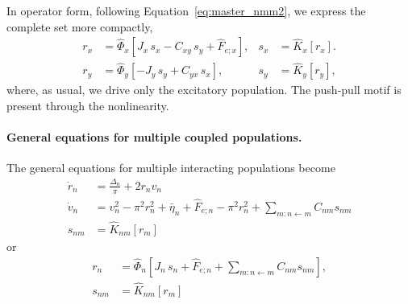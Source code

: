 \documentclass[12pt]{article}
\numberwithin{equation}{section}
\begin{document}
In operator form, following Equation~\ref{eq:master_nmm2}, we express the complete set more compactly,
\begin{equation}
\begin{aligned}
     r_x &=  \hat \Phi_x [J_x\, s_x - C_{xy} \, s_y +\hat F_{e;x}], & 
 s_x &= \hat K_x [r_x]. \\
  r_y &=  \hat \Phi_y [-J_y\, s_y +  C_{yx} \, s_x ], & 
 s_y &= \hat K_y[r_y], 
\end{aligned}
\end{equation}
where, as usual, we drive only the excitatory population. The push-pull motif is present through the nonlinearity. 


\paragraph{General equations for multiple coupled populations.} The general equations for multiple interacting populations become 
\begin{equation}
\begin{aligned} \label{eq:nmm2-general}
\dot r_n &=   \frac{\Delta_n}{\pi} + 2r_nv_n    \\
\dot v_n &=  v_n^2  -  \pi^2 r_n^2 
 + \bar \eta_n +\hat F_{e;n} -  \pi^2 r_n^2 + \sum_{m:n\leftarrow m} C_{nm} s_{nm}  \\
s_{nm} &= \hat K_{nm} [r_{m}]
\end{aligned}
\end{equation}
or
\begin{equation}
\begin{aligned}
     r_n &=  \hat \Phi_n [J_n\, s_n + \hat F_{e;n}  + \sum_{m:n\leftarrow m} C_{nm} s_{nm} ],   \\
 s_{nm} &= \hat K_{nm} [r_{m}]
\end{aligned}
\end{equation}
\end{document}

